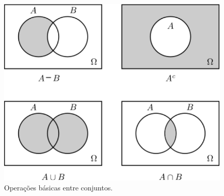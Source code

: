 \begin{frame}
 \begin{figure}[!htb]
\begin{center}
\includegraphics[angle=0, scale=0.72]{fig1-1.pdf}
\caption{\label{fig1} Operações básicas entre conjuntos.}
\end{center}
\end{figure} 
\end{frame}

